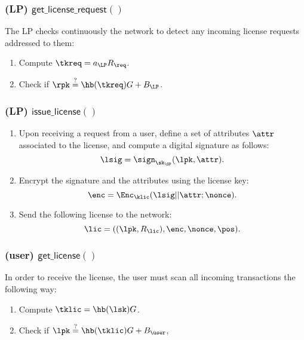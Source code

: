 \subsubsection{(\textbf{LP}) $\mathsf{get\_license\_request()}$}

The LP checks continuously the network to detect any incoming license requests addressed to them:

\begin{enumerate}
	\item Compute $\tkreq = a_{\LP}R_{\req}$.
	\item Check if $\rpk \stackrel{?}{=} \hb(\tkreq) G + B_{\LP}$.
\end{enumerate}


\subsubsection{(\textbf{LP}) $\mathsf{issue\_license()}$}

\begin{enumerate}
	\item Upon receiving a request from a user, define a set of attributes $\attr$ associated to the license, and compute a digital signature as follows:
	$$\lsig = \sign_{\sk_{\SP}}(\lpk, \attr).$$
	\item Encrypt the signature and the attributes using the license key:
	$$\enc = \Enc_{\klic} (\lsig || \attr; \nonce).$$
	\item Send the following license to the network:
	$$\lic = ((\lpk, R_{\lic}), \enc, \nonce, \pos).$$
\end{enumerate}

\subsubsection{(\textbf{user}) $\mathsf{get\_license()}$}

In order to receive the license, the user must scan all incoming transactions the following way:

\begin{enumerate}
	\item Compute $\tklic = \hb(\lsk)G$.
	\item Check if $\lpk \stackrel{?}{=} \hb(\tklic) G + B_{\user}$, 
\end{enumerate}	

